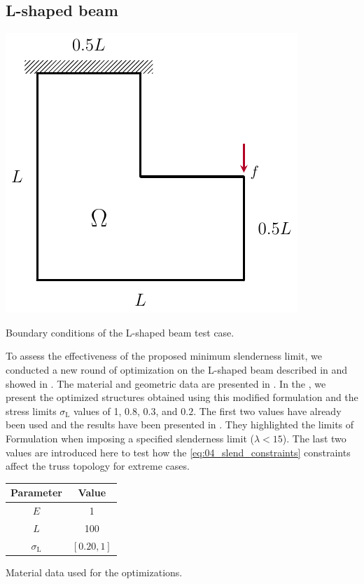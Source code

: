 \subsection{L-shaped beam}
\begin{marginfigure}
    \centering
    \includegraphics[width=\linewidth]{figures/04_TTO_improvements/06_L_bc/L_bc.pdf}
    \caption{Boundary conditions of the L-shaped beam test case.}
    \label{fig:04_LBC}
\end{marginfigure}
To assess the effectiveness of the proposed minimum slenderness limit, we conducted a new round of optimization on the L-shaped beam described in  and showed in . The material and geometric data are presented in . In the , we present the optimized structures obtained using this modified formulation and the stress limits $\sigma_\text{L}$ values of 1, $0.8$, $0.3$, and $0.2$. The first two values have already been used and the results have been presented in . They highlighted the limits of Formulation  when imposing a specified slenderness limit ($\lambda<15$). The last two values are introduced here to test how the \ref{eq:04_slend_constraints} constraints affect the truss topology for extreme cases. 
\begin{margintable}
    \small
    \centering
    \begin{tabular}{cc}
    \toprule
    \textbf{Parameter}        & \textbf{Value} \\ \midrule
    $E$              & 1     \\
    $L$              & 100   \\
    $\sigma_\text{L}$ & $[0.20,1]$ \\
    \bottomrule
    \end{tabular}
    \caption{Material data used for the optimizations.}
    \label{tab:04_mat_l}
\end{margintable}

